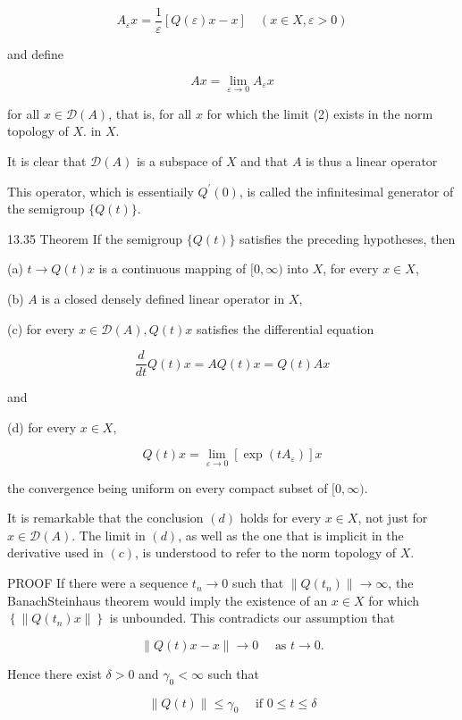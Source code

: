 \documentclass[10pt]{article}
\begin{document}
$$
A_{\varepsilon} x=\frac{1}{\varepsilon}[Q(\varepsilon) x-x] \quad(x \in X, \varepsilon>0)
$$

and define

$$
A x=\lim _{\varepsilon \rightarrow 0} A_{\varepsilon} x
$$

for all $x \in \mathscr{D}(A)$, that is, for all $x$ for which the limit (2) exists in the norm topology of $X$. in $X$.

It is clear that $\mathscr{D}(A)$ is a subspace of $X$ and that $A$ is thus a linear operator

This operator, which is essentiaily $Q^{\prime}(0)$, is called the infinitesimal generator of the semigroup $\{Q(t)\}$.

13.35 Theorem If the semigroup $\{Q(t)\}$ satisfies the preceding hypotheses, then

(a) $t \rightarrow Q(t) x$ is a continuous mapping of $[0, \infty)$ into $X$, for every $x \in X$,

(b) $A$ is a closed densely defined linear operator in $X$,

(c) for every $x \in \mathscr{D}(A), Q(t) x$ satisfies the differential equation

$$
\frac{d}{d t} Q(t) x=A Q(t) x=Q(t) A x
$$

and

(d) for every $x \in X$,

$$
Q(t) x=\lim _{\varepsilon \rightarrow 0}\left[\exp \left(t A_{\varepsilon}\right)\right] x
$$

the convergence being uniform on every compact subset of $[0, \infty)$.

It is remarkable that the conclusion $(d)$ holds for every $x \in X$, not just for $x \in \mathscr{D}(A)$. The limit in $(d)$, as well as the one that is implicit in the derivative used in $(c)$, is understood to refer to the norm topology of $X$.

PROOF If there were a sequence $t_{n} \rightarrow 0$ such that $\left\|Q\left(t_{n}\right)\right\| \rightarrow \infty$, the BanachSteinhaus theorem would imply the existence of an $x \in X$ for which $\left\{\left\|Q\left(t_{n}\right) x\right\|\right\}$ is unbounded. This contradicts our assumption that

$$
\|Q(t) x-x\| \rightarrow 0 \quad \text { as } t \rightarrow 0 .
$$

Hence there exist $\delta>0$ and $\gamma_{0}<\infty$ such that

$$
\|Q(t)\| \leq \gamma_{0} \quad \text { if } 0 \leq t \leq \delta
$$
\end{document}
